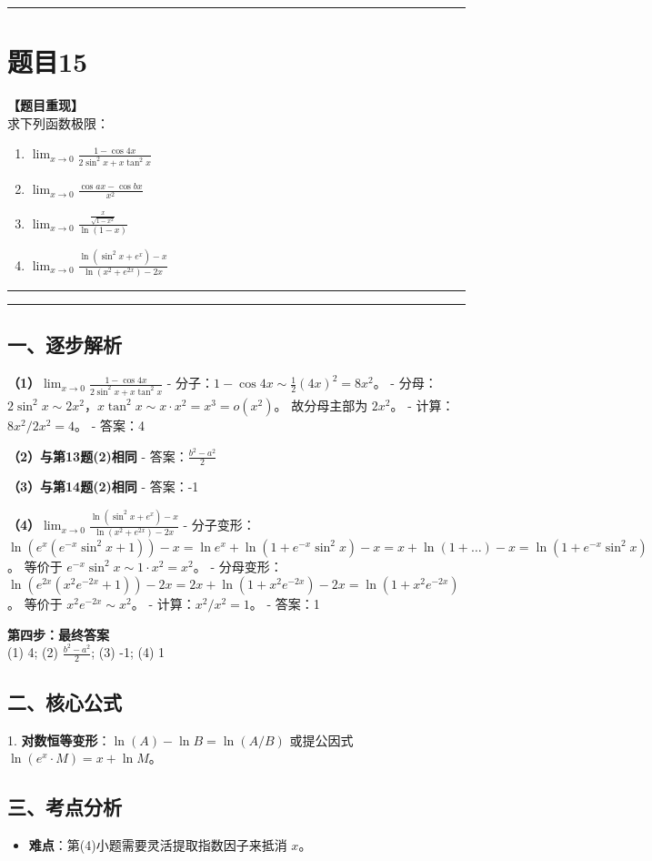 \documentclass[12pt, a4paper]{ctexart}
\newcommand{\TopSeparator}{
    \par\noindent\rule{\textwidth}{1.5pt}\vspace{0.5em} %
}
\newcommand{\AnalysisSeparator}{
    \par\noindent\rule{\textwidth}{0.5pt}\vspace{0.2em}\hrule\vspace{0.5em} %
}
\newenvironment{RedAnalysis}{
    \par
    \color{red} %
}{
    \par
    \color{black} %
}
\begin{document}
\TopSeparator
\section*{题目15}

\textbf{【题目重现】} \\
求下列函数极限：
\begin{enumerate}
    \item $ \lim_{x\to0}\frac{1-\cos 4x}{2\sin^{2}x+x\tan^{2}x} $
    \item $ \lim_{x \to 0} \frac{\cos ax - \cos bx}{x^{2}} $
    \item $ \lim_{x\to0}\frac{\frac{x}{\sqrt{1-x^{2}}}}{\ln(1-x)} $
    \item $ \lim_{x\to0}\frac{\ln(\sin^{2}x+e^{x})-x}{\ln(x^{2}+e^{2x})-2x} $
\end{enumerate}

\AnalysisSeparator

\begin{RedAnalysis}

\subsection*{一、逐步解析}

\textbf{（1）$ \lim_{x\to0}\frac{1-\cos 4x}{2\sin^{2}x+x\tan^{2}x} $}
   - 分子：$1-\cos 4x \sim \frac{1}{2}(4x)^2 = 8x^2$。
   - 分母：$2\sin^2 x \sim 2x^2$，$x\tan^2 x \sim x \cdot x^2 = x^3 = o(x^2)$。
     故分母主部为 $2x^2$。
   - 计算：$8x^2 / 2x^2 = 4$。
   - 答案：4

\textbf{（2）与第13题(2)相同}
   - 答案：$\frac{b^2-a^2}{2}$

\textbf{（3）与第14题(2)相同}
   - 答案：-1

\textbf{（4）$ \lim_{x\to0}\frac{\ln(\sin^{2}x+e^{x})-x}{\ln(x^{2}+e^{2x})-2x} $}
   - 分子变形：$\ln(e^x(e^{-x}\sin^2 x + 1)) - x = \ln e^x + \ln(1+e^{-x}\sin^2 x) - x = x + \ln(1+\dots) - x = \ln(1+e^{-x}\sin^2 x)$。
     等价于 $e^{-x}\sin^2 x \sim 1 \cdot x^2 = x^2$。
   - 分母变形：$\ln(e^{2x}(x^2 e^{-2x}+1)) - 2x = 2x + \ln(1+x^2 e^{-2x}) - 2x = \ln(1+x^2 e^{-2x})$。
     等价于 $x^2 e^{-2x} \sim x^2$。
   - 计算：$x^2 / x^2 = 1$。
   - 答案：1

\textbf{第四步：最终答案} \\
(1) 4; (2) $\frac{b^2-a^2}{2}$; (3) -1; (4) 1

\subsection*{二、核心公式}
1. \textbf{对数恒等变形}：$\ln(A) - \ln B = \ln(A/B)$ 或提公因式 $\ln(e^x \cdot M) = x + \ln M$。

\subsection*{三、考点分析}
\begin{itemize}
    \item \textbf{难点}：第(4)小题需要灵活提取指数因子来抵消 $x$。
\end{itemize}

\end{RedAnalysis}
\end{document}
